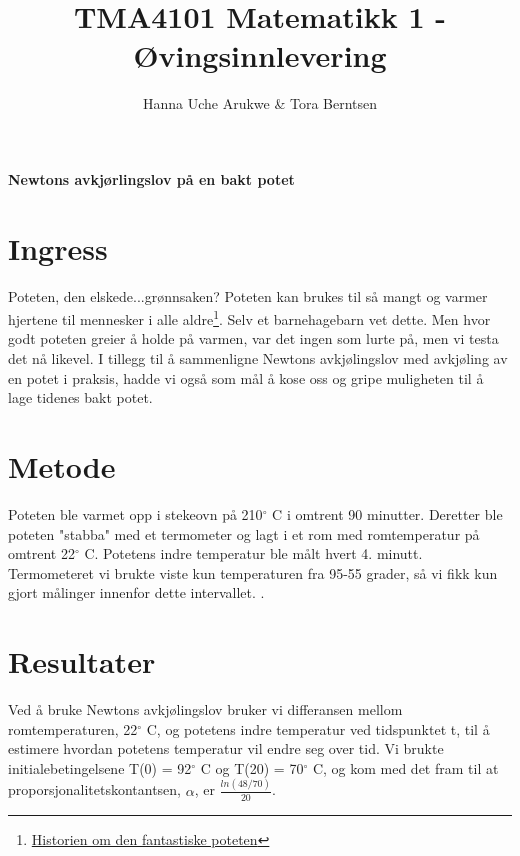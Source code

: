 \documentclass[12pt]{article}
\begin{document}
 
 
\title{TMA4101 Matematikk 1 - Øvingsinnlevering}%
\author{Hanna Uche Arukwe & Tora Berntsen\\ %
} %
 
\maketitle\textbf{Newtons avkjørlingslov på en bakt potet}

\section{Ingress}
Poteten, den elskede...grønnsaken? Poteten kan brukes til så mangt og varmer hjertene til mennesker i alle aldre\footnote{\href{https://www.youtube.com/watch?v=r-L71ZNHRps} {Historien om den fantastiske poteten}}. Selv et barnehagebarn vet dette. Men hvor godt poteten greier å holde på varmen, var det ingen som lurte på, men vi testa det nå likevel. I tillegg til å sammenligne Newtons avkjølingslov med avkjøling av en potet i praksis, hadde vi også som mål å kose oss og  gripe muligheten til å lage tidenes bakt potet. 

\section{Metode}
Poteten ble varmet opp i stekeovn på 210$^{\circ}$ C i omtrent 90 minutter.  Deretter ble poteten "stabba" med et termometer og lagt i et rom med romtemperatur på omtrent 22$^{\circ}$ C. Potetens indre temperatur ble målt hvert 4. minutt.  Termometeret vi brukte viste kun temperaturen fra 95-55 grader, så vi fikk kun gjort målinger innenfor dette intervallet. . 
 
\section{Resultater}
Ved å bruke Newtons avkjølingslov bruker vi differansen mellom romtemperaturen, 22$^{\circ}$ C, og potetens indre temperatur  ved tidspunktet t, til å estimere hvordan potetens temperatur vil endre seg over tid. Vi brukte initialebetingelsene T(0) = 92$^{\circ}$ C og T(20) = 70$^{\circ}$ C, og kom med det fram til at proporsjonalitetskontantsen, \(\alpha\), er 
\(\frac{ln(48/70)}{20}\).
\end{document}
